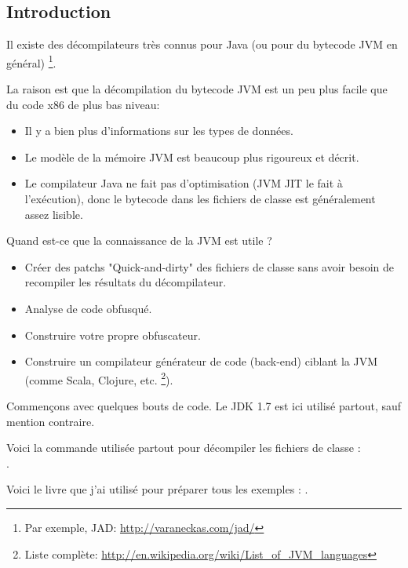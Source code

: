 \subsection{Introduction}

\newcommand{\JADURL}{\url{http://varaneckas.com/jad/}}

Il existe des décompilateurs très connus pour Java (ou pour du bytecode \ac{JVM} en général)
\footnote{Par exemple, JAD: \JADURL}.

La raison est que la décompilation du bytecode \ac{JVM} est un peu plus facile
que du code x86 de plus bas niveau:

\begin{itemize}
\item Il y a bien plus d'informations sur les types de données.
\item Le modèle de la mémoire \ac{JVM} est beaucoup plus rigoureux et décrit.
\item Le compilateur Java ne fait pas d'optimisation (\ac{JVM} \ac{JIT} le fait à l'exécution),
      donc le bytecode dans les fichiers de classe est généralement assez lisible.
      
\end{itemize}

Quand est-ce que la connaissance de la \ac{JVM} est utile ?

\newcommand{\URLListOfJVMLangs}{\url{http://en.wikipedia.org/wiki/List_of_JVM_languages}}

\begin{itemize}
\item Créer des patchs "Quick-and-dirty" des fichiers de classe sans avoir besoin de recompiler les résultats du décompilateur.
\item Analyse de code obfusqué.
\item Construire votre propre obfuscateur.
\item Construire un compilateur générateur de code (back-end) ciblant la \ac{JVM} (comme Scala, Clojure, etc.
      \footnote{Liste complète: \URLListOfJVMLangs}).
      
\end{itemize}

Commençons avec quelques bouts de code.
Le JDK 1.7 est ici utilisé partout, sauf mention contraire.

Voici la commande utilisée partout pour décompiler les fichiers de classe :\\
.

Voici le livre que j'ai utilisé pour préparer tous les exemples : \JavaBook.

